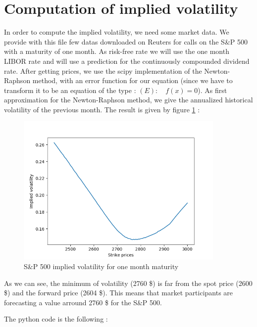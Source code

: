 \documentclass[hidelinks]{article}
\theoremstyle{definition}
\begin{document}
\section{Computation of implied volatility}
\label{sec:iv_calculus}

In order to compute the implied volatility, we need some market data. We provide with this file few datas downloaded on Reuters for calls on the S\&P 500 with a maturity of one month. As risk-free rate we will use the one month LIBOR rate and will use a prediction for the continuously compounded dividend rate. After getting prices, we use the scipy implementation of the Newton-Raphson method, with an error function for our equation (since we have to transform it to be an equation of the type : $(E): \quad f(x) = 0$). As first approximation for the Newton-Raphson method, we give the annualized historical volatility of the previous month. The result is given by figure \ref{fig:sp_iv} :

\begin{figure}[!h]
	\centering
	\includegraphics[width=0.9\textwidth]{SP500_iv.png}
    \caption{S\&P 500 implied volatility for one month maturity}
    \label{fig:sp_iv}
    \end{figure}
    
    As we can see, the minimum of volatility (2760 \$) is far from the spot price (2600 \$) and the forward price (2604 \$). This means that market participants are forecasting a value arround 2760 \$ for the S\&P 500.
   
    The python code is the following :
    
    
\end{document}
